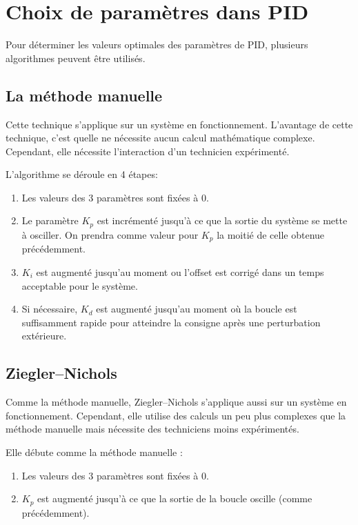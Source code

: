 \section{Choix de paramètres dans PID}

Pour déterminer les valeurs optimales des paramètres de PID, plusieurs algorithmes peuvent être utilisés.

\subsection{La méthode manuelle}
Cette technique s'applique sur un système en fonctionnement.
L'avantage de cette technique, c'est quelle ne nécessite aucun calcul mathématique complexe.
Cependant, elle nécessite l'interaction d'un technicien expérimenté.

L'algorithme se déroule en 4 étapes:
\begin{enumerate}
	\item Les valeurs des 3 paramètres sont fixées à $0$.
	\item Le paramètre $K_p$ est incrémenté jusqu'à ce que la sortie du système se mette à osciller.
	On prendra comme valeur pour $K_p$ la moitié de celle obtenue précédemment.
	\item $K_i$ est augmenté jusqu'au moment ou l'offset est corrigé dans un temps acceptable pour le système.
	\item Si nécessaire, $K_d$ est augmenté jusqu'au moment où la boucle est suffisamment rapide pour atteindre la consigne après une perturbation extérieure.
\end{enumerate}

\subsection{Ziegler–Nichols}
Comme la méthode manuelle, Ziegler–Nichols s'applique aussi sur un système en fonctionnement. Cependant, elle utilise des calculs un peu plus complexes que la méthode manuelle mais nécessite des techniciens moins expérimentés.\cite{ziegler1942optimum}\cite{silva2007pid}

Elle débute comme la méthode manuelle :
\begin{enumerate}
	\item Les valeurs des 3 paramètres sont fixées à $0$.
	\item $K_p$ est augmenté jusqu'à ce que la sortie de la boucle oscille (comme précédemment).
\end{enumerate}

